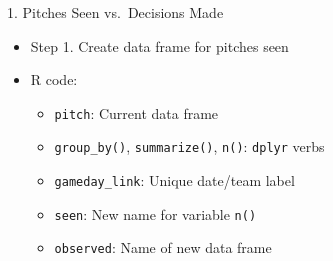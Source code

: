 \begin{frame}[fragile]{1. Pitches Seen vs.~Decisions Made}

\begin{itemize}
\tightlist
\item
  Step 1. Create data frame for pitches seen
\item
  R code:

  \begin{itemize}
  \tightlist
  \item
    \texttt{pitch}: Current data frame
  \item
    \texttt{group\_by()}, \texttt{summarize()}, \texttt{n()}:
    \texttt{dplyr} verbs
  \item
    \texttt{gameday\_link}: Unique date/team label
  \item
    \texttt{seen}: New name for variable \texttt{n()}
  \item
    \texttt{observed}: Name of new data frame
  \end{itemize}
\end{itemize}

\footnotesize

\begin{Shaded}
\end{Shaded}

\end{frame}

